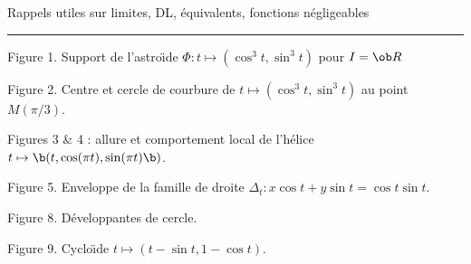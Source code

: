 \centerline{Rappels utiles sur limites, DL, \'equivalents, fonctions n\'egligeables}
\hrule
\medskip
\bigskip
{}\hfill\null\pn
\centerline{Figure 1. \qquad Support de l'astro\"\i de $\Phi:t\mapsto(\cos^3t,\sin^3t)$ pour $I=\ob R$}

\hfill{}\hfill\null\pn
\centerline{Figure 2. \qquad Centre et cercle 
de courbure de $t\mapsto(\cos^3t,\sin^3t)$ au point $M(\pi/3)$. }

\noindent\epsfxsize 6cm
\epsfxsize 5cm
\medskip
\centerline{ Figures 3 \& 4 : allure 
et comportement local de l'h\'elice $t\mapsto \b(t,\cos(\pi t),\sin(\pi t)\b)$.}
\bigskip
\epsfxsize=6cm\noindent
\hfill{}\hfill\null
\medskip
\centerline{Figure 5. Enveloppe de la famille de droite $\Delta_t:x\cos t+y\sin t=\cos t\sin t$.}
\bigskip
\medskip\epsfxsize=5cm
\epsfysize=5cm
\noindent\hfill{}\hfill\epsfxsize=5cm
\epsfysize=5cm
\hfill\null
\medskip
\bigskip
\noindent\hfill
{}\hfill\null
\medskip
\centerline{Figure 8. D\'eveloppantes de cercle.}
\bigskip
\medskip\noindent
\hfill{}\hfill\null
\medskip
\centerline{Figure 9. 
Cyclo\"\i de $t\mapsto(t-\sin t,1-\cos t)$.} 
\bigskip
\medskip\epsfxsize=6cm
\noindent\hfill{}\hfill\null
\medskip
\bye

